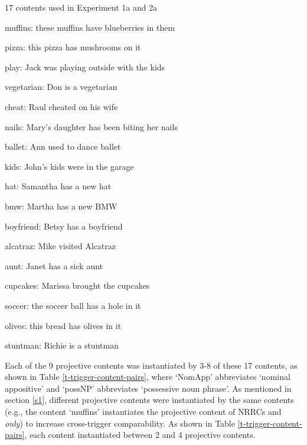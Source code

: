 \documentclass[11pt,fleqn]{article}
\newcommand{\6}{\mbox{$[\hspace*{-.6mm}[$}}
\newcommand{\9}{\mbox{$]\hspace*{-.6mm}]$}}
\begin{document}
\begin{exe}
\ex\label{contents} 17 contents used in Experiment 1a and 2a

\begin{enumerate}[itemsep=-.5mm]

\ex muffins: these muffins have blueberries in them

\ex pizza: this pizza has mushrooms on it

\ex play: Jack was playing outside with the kids

\ex vegetarian: Don is a vegetarian

\ex cheat: Raul cheated on his wife

\ex nails: Mary's daughter has been biting her nails

\ex ballet: Ann used to dance ballet

\ex kids: John's kids were in the garage

\ex hat: Samantha has a new hat

\ex bmw: Martha has a new BMW

\ex boyfriend: Betsy has a boyfriend

\ex alcatraz: Mike visited Alcatraz

\ex aunt: Janet has a sick aunt

\ex cupcakes: Marissa brought the cupcakes

\ex soccer: the soccer ball has a hole in it

\ex olives: this bread has olives in it

\ex stuntman: Richie is a stuntman

\end{enumerate}
\end{exe}

Each of the 9 projective contents was instantiated by 3-8 of these 17 contents, as shown in Table \ref{t-trigger-content-pairs}, where `NomApp' abbreviates `nominal appositive' and `possNP' abbreviates `possessive noun phrase'. As mentioned in section \ref{s1}, different projective contents were instantiated by the same contents (e.g., the content `muffins' instantiates the projective content of NRRCs and {\em only}) to increase cross-trigger comparability. As shown in Table \ref{t-trigger-content-pairs}, each content instantiated between 2 and 4 projective contents.
\end{document}
